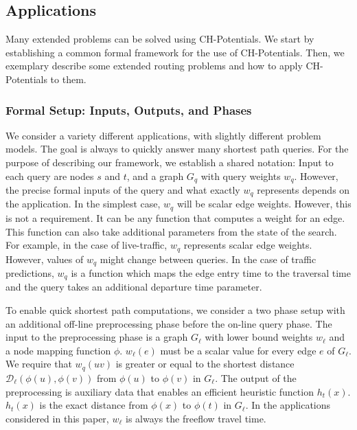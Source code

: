 \documentclass[manuscript,review]{acmart}
\newcommand*{\dist}{\mathcal{D}}
\begin{document}
\subsection{Applications}\label{sec:extensions}

Many extended problems can be solved using CH-Potentials.
We start by establishing a common formal framework for the use of CH-Potentials.
Then, we exemplary describe some extended routing problems and how to apply CH-Potentials to them.

\subsubsection{Formal Setup: Inputs, Outputs, and Phases}

We consider a variety different applications, with slightly different problem models.
The goal is always to quickly answer many shortest path queries.
For the purpose of describing our framework, we establish a shared notation:
Input to each query are nodes $s$ and $t$, and a graph $G_q$ with query weights $w_q$.
However, the precise formal inputs of the query and what exactly $w_q$ represents depends on the application.
In the simplest case, $w_q$ will be scalar edge weights.
However, this is not a requirement.
It can be any function that computes a weight for an edge.
This function can also take additional parameters from the state of the search.
For example, in the case of live-traffic, $w_q$ represents scalar edge weights.
However, values of $w_q$ might change between queries.
In the case of traffic predictions, $w_q$ is a function which maps the edge entry time to the traversal time and the query takes an additional departure time parameter.

To enable quick shortest path computations, we consider a two phase setup with an additional off-line preprocessing phase before the on-line query phase.
The input to the preprocessing phase is a graph $G_\ell$ with lower bound weights $w_\ell$ and a node mapping function $\phi$.
$w_\ell(e)$ must be a scalar value for every edge $e$ of $G_\ell$.
We require that $w_q(u v)$ is greater or equal to the shortest distance $\dist_\ell(\phi(u), \phi(v))$ from $\phi(u)$ to $\phi(v)$ in $G_\ell$. %
The output of the preprocessing is auxiliary data that enables an efficient heuristic function $h_t(x)$.
$h_t(x)$ is the exact distance from $\phi(x)$ to $\phi(t)$ in $G_\ell$.
In the applications considered in this paper, $w_\ell$ is always the freeflow travel time.
\end{document}
